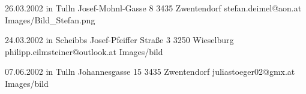
\begin{Diplomandenvorstellung}
		  {26.03.2002 in Tulln}
		  {Josef-Mohnl-Gasse 8}
		  {3435 Zwentendorf}
		  {
		  }
		  {stefan.deimel@aon.at}
		  {Images/Bild_Stefan.png}
\newpage	  

		  {24.03.2002 in Scheibbs}
		  {Josef-Pfeiffer Straße 3}
		  {3250 Wieselburg}
		  {
		  }
		  {philipp.eilmsteiner@outlook.at}
		  {Images/bild}
\newpage

		  {07.06.2002 in Tulln}
		  {Johannesgasse 15}
		  {3435 Zwentendorf}
		  {
		  }
		  {juliastoeger02@gmx.at}
		  {Images/bild}
		  
\end{Diplomandenvorstellung}

